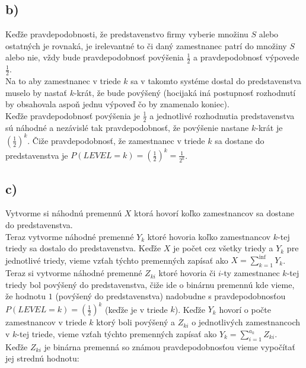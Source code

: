 \documentclass[a4paper]{article}
\begin{document}
\subsection*{b)}

Keďže pravdepodobnosti, že predstavenstvo firmy vyberie množinu $S$ alebo ostatných je rovnaká, je irelevantné to či daný zamestnanec patrí do množiny $S$ alebo nie, vždy bude pravdepodobnosť povýšenia $\frac{1}{2}$ a pravdepodobnosť výpovede $\frac{1}{2}$. 
\\

Na to aby zamestnanec v triede $k$ sa v takomto systéme dostal do predstavenstva muselo by nastať $k$-krát, že bude povýšený (hocijaká iná postupnosť rozhodnutí by obsahovala aspoň jednu výpoveď čo by znamenalo koniec).
\\

Keďže pravdepodobnosť povýšenia je $\frac{1}{2}$ a jednotlivé rozhodnutia predstavenstva sú náhodné a nezávislé tak pravdepodobnosť, že povýšenie nastane $k$-krát je $\left(\frac{1}{2}\right)^k$. Čiže pravdepodobnosť, že zamestnanec v triede $k$ sa dostane do predstavenstva je $P(LEVEL=k)=\left(\frac{1}{2}\right)^k=\frac{1}{2^k}$.

\subsection*{c)}

Vytvorme si náhodnú premennú $X$ ktorá hovorí koľko zamestnancov sa dostane do predstavenstva. 
\\

Teraz vytvorme náhodné premenné $Y_k$ ktoré hovoria koľko zamestnancov $k$-tej triedy sa dostalo do predstavenstva. Keďže $X$ je počet cez všetky triedy a $Y_k$ pre jednotlivé triedy, vieme vzťah týchto premenných zapísať ako $X = \sum_{k=1}^{\inf} Y_k$. 
\\

Teraz si vytvorme náhodné premenné $Z_{ki}$ ktoré hovoria či $i$-ty zamestnanec $k$-tej triedy bol povýšený do predstavenstva, čiže ide o binárnu premennú kde vieme, že hodnotu $1$ (povýšený do predstavenstva) nadobudne s pravdepodobnosťou $P(LEVEL=k)=\left(\frac{1}{2}\right)^k$ (keďže je v triede $k$). Keďže $Y_k$ hovorí o počte zamestnancov v triede $k$ ktorý boli povýšený a $Z_{ki}$ o jednotlivých zamestnancoch v $k$-tej triede, vieme vzťah týchto premenných zapísať ako $Y_k = \sum_{i=1}^{a_k} Z_{ki}$.
\\

Keďže $Z_{ki}$ je binárna premenná so známou pravdepodobnosťou vieme vypočítať jej strednú hodnotu: 
\end{document}
